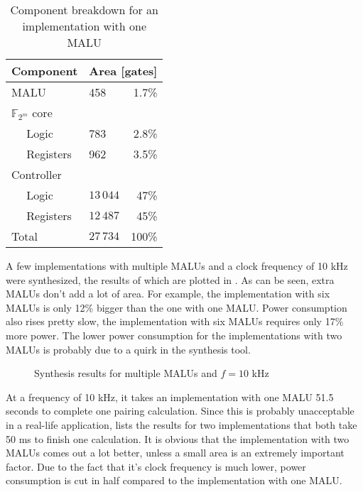 \begin{table}[h]
	\caption{Component breakdown for an implementation with one MALU}
	\label{table-breakdown}
	\centering
	\begin{tabular}{llr}
		\toprule
		Component					& \multicolumn{2}{c}{Area [gates]}\\
		\midrule
		MALU				 			& 458			& 1.7\%\\
		$\mathbb{F}_{2^m}$ core	&				& \\
		$\quad$ Logic				& 783			& 2.8\%\\
		$\quad$ Registers			& 962			& 3.5\%\\
		Controller					&				& \\
		$\quad$ Logic				& $13\,044$	& 47\%\\
		$\quad$ Registers			& $12\,487$	& 45\%\\
		\midrule
		Total							& $27\,734$	& 100\%\\
		\bottomrule		
	\end{tabular}
\end{table}

A few implementations with multiple MALUs and a clock frequency of 10 kHz were synthesized, the results of which are plotted in . As can be seen, extra MALUs don't add a lot of area. For example, the implementation with six MALUs is only 12\% bigger than the one with one MALU. Power consumption also rises pretty slow, the implementation with six MALUs requires only 17\% more power. The lower power consumption for the implementations with two MALUs is probably due to a quirk in the synthesis tool.

\begin{figure}[h]
	\centering
		\caption{Synthesis results for multiple MALUs and $f = 10$ kHz\label{figure-mult-malu}}
\end{figure}

At a frequency of 10 kHz, it takes an implementation with one MALU 51.5 seconds to complete one pairing calculation. Since this is probably unacceptable in a real-life application,  lists the results for two implementations that both take 50 ms to finish one calculation. It is obvious that the implementation with two MALUs comes out a lot better, unless a small area is an extremely important factor. Due to the fact that it's clock frequency is much lower, power consumption is cut in half compared to the implementation with one MALU.

